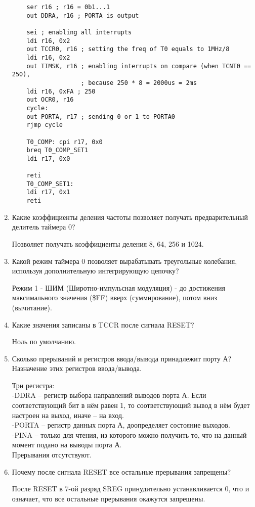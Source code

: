 \documentclass{lab}
\begin{document}
\begin{enumerate}
{\begin{verbatim}
	ser r16 ; r16 = 0b1...1
	out DDRA, r16 ; PORTA is output
	
	sei ; enabling all interrupts
	ldi r16, 0x2
	out TCCR0, r16 ; setting the freq of T0 equals to 1MHz/8
	ldi r16, 0x2
	out TIMSK, r16 ; enabling interrupts on compare (when TCNT0 == 250),
	               ; because 250 * 8 = 2000us = 2ms
	ldi r16, 0xFA ; 250
	out OCR0, r16
	cycle:
	out PORTA, r17 ; sending 0 or 1 to PORTA0
	rjmp cycle
	
	T0_COMP: cpi r17, 0x0
	breq T0_COMP_SET1
	ldi r17, 0x0
	
	reti
	T0_COMP_SET1:
	ldi r17, 0x1
	reti
	\end{verbatim}
	}
	
	\item Какие коэффициенты деления частоты позволяет получать предварительный делитель таймера 0?
	
	Позволяет получать коэффициенты деления 8, 64, 256 и 1024.
	
	\item Какой режим таймера 0 позволяет вырабатывать треугольные колебания, используя дополнительную интегрирующую цепочку?
	
	Режим 1 - ШИМ (Широтно-импульсная модуляция) - до достижения максимального значения (\$FF) вверх (суммирование), потом вниз (вычитание).
	
	\item Какие значения записаны в TCCR после сигнала RESET?
	
	Ноль по умолчанию.
	
	\item Сколько прерываний и регистров ввода/вывода принадлежит порту А? Назначение этих регистров ввода/вывода.
	
	Три регистра: \\
	-DDRA – регистр выбора направлений выводов порта А. Если соответствующий бит в нём равен 1, то соответствующий вывод в нём будет настроен на выход, иначе – на вход. \\
	-PORTA – регистр данных порта А, доопределяет состояние выходов. \\
	-PINA – только для чтения, из которого можно получить то, что на данный момент подано на выводы порта А.\\
	
	Прерывания отсутствуют.
	
	\item Почему после сигнала RESET все остальные прерывания запрещены?
	
	После RESET в 7-ой разряд SREG принудительно устанавливается 0, что и означает, что все остальные прерывания окажутся запрещены.
	

\end{enumerate}
\end{document}
